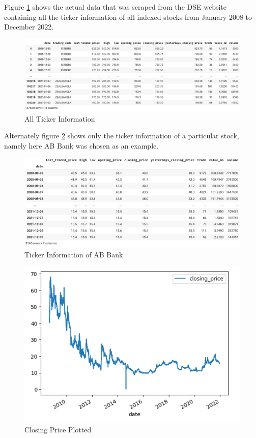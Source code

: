 \documentclass[conference]{IEEEtran}
\begin{document}
Figure \ref{fig:fig1} shows the actual data that was scraped from the DSE website containing all the ticker information of all indexed stocks from January 2008 to December 2022.

\begin{figure}[htbp]
    \centering
    \includegraphics[width=0.975\columnwidth]{fig1.png}
    \caption{All Ticker Information}
    \label{fig:fig1}
\end{figure}

Alternately figure \ref{fig:fig2} shows only the ticker information of a particular stock, namely here AB Bank was chosen as an example.

\begin{figure}[htbp]
    \centering
    \includegraphics[width=0.975\columnwidth]{fig2.png}
    \caption{Ticker  Information of AB Bank}
    \label{fig:fig2}
\end{figure}

\begin{figure}[htbp]
    \centering
    \includegraphics[width=0.975\columnwidth]{fig3.png}
    \caption{Closing Price Plotted}
    \label{fig:fig3}
\end{figure}
\end{document}
